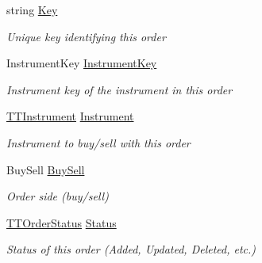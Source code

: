 \begin{DoxyCompactItemize}
\item 
string \hyperlink{class_e_z_a_p_i_1_1_containers_1_1_t_t_order_a1d4d49cfa0a420cc94aa0e499a0805ad}{Key}
\begin{DoxyCompactList}\small\item\em Unique key identifying this order \end{DoxyCompactList}\item 
Instrument\-Key \hyperlink{class_e_z_a_p_i_1_1_containers_1_1_t_t_order_a7e8e8a9a7ecbf614117caea02d3318e0}{Instrument\-Key}
\begin{DoxyCompactList}\small\item\em Instrument key of the instrument in this order \end{DoxyCompactList}\item 
\hyperlink{class_e_z_a_p_i_1_1_containers_1_1_t_t_instrument}{T\-T\-Instrument} \hyperlink{class_e_z_a_p_i_1_1_containers_1_1_t_t_order_a70ca04ba0abdcc43e85e91529f2240eb}{Instrument}
\begin{DoxyCompactList}\small\item\em Instrument to buy/sell with this order \end{DoxyCompactList}\item 
Buy\-Sell \hyperlink{class_e_z_a_p_i_1_1_containers_1_1_t_t_order_afaa68ec2f1b6dec2a5564a794d436a3c}{Buy\-Sell}
\begin{DoxyCompactList}\small\item\em Order side (buy/sell) \end{DoxyCompactList}\item 
\hyperlink{namespace_e_z_a_p_i_1_1_containers_a195b281517d19ae193243894635d7547}{T\-T\-Order\-Status} \hyperlink{class_e_z_a_p_i_1_1_containers_1_1_t_t_order_af67181ef5bafdbac8d2e49df4a106a43}{Status}
\begin{DoxyCompactList}\small\item\em Status of this order (Added, Updated, Deleted, etc.) \end{DoxyCompactList}\item 

\end{DoxyCompactItemize}
